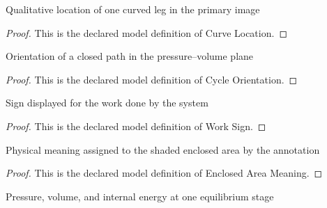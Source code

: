 \begin{definition}
  \label{def:physics:phyx-mini-0470:phyxminiproblems-problemphyxmini0470-curvelocation}
  Qualitative location of one curved leg in the primary image
\end{definition}
\begin{proof}
  This is the declared model definition of Curve Location.
\end{proof}
\begin{definition}
  \label{def:physics:phyx-mini-0470:phyxminiproblems-problemphyxmini0470-cycleorientation}
  Orientation of a closed path in the pressure--volume plane
\end{definition}
\begin{proof}
  This is the declared model definition of Cycle Orientation.
\end{proof}
\begin{definition}
  \label{def:physics:phyx-mini-0470:phyxminiproblems-problemphyxmini0470-worksign}
  Sign displayed for the work done by the system
\end{definition}
\begin{proof}
  This is the declared model definition of Work Sign.
\end{proof}
\begin{definition}
  \label{def:physics:phyx-mini-0470:phyxminiproblems-problemphyxmini0470-enclosedareameaning}
  Physical meaning assigned to the shaded enclosed area by the annotation
\end{definition}
\begin{proof}
  This is the declared model definition of Enclosed Area Meaning.
\end{proof}
\begin{definition}
  \label{def:physics:phyx-mini-0470:phyxminiproblems-problemphyxmini0470-thermodynamicstate}
  Pressure, volume, and internal energy at one equilibrium stage
\end{definition}
